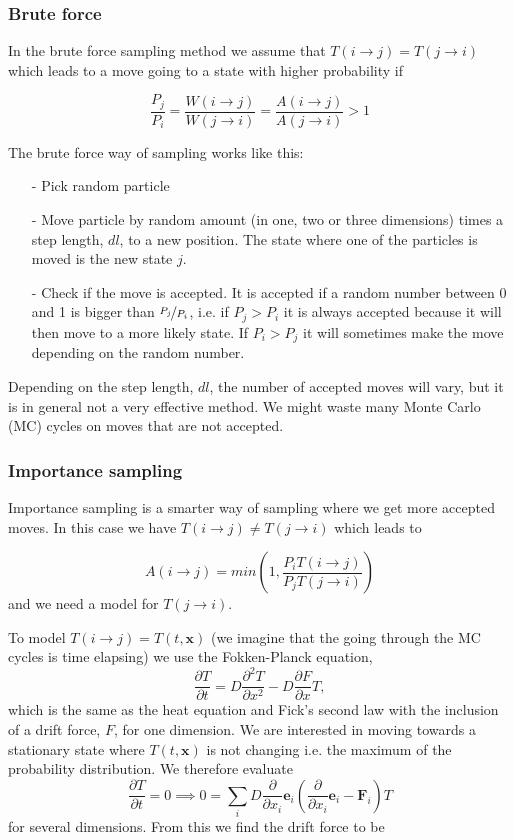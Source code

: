 \subsubsection{Brute force}

In the brute force sampling method we assume that $ T(i\rightarrow j) = T(j\rightarrow i)$ which leads to a move going to a state with higher probability if

$$ \frac{P_j}{P_i} = \frac{W(i\rightarrow j)}{W(j\rightarrow i)} = \frac{A(i\rightarrow j)}{A(j\rightarrow i)} > 1$$

The brute force way of sampling works like this:
\begin{itemize}
\item[-] Pick random particle
\item[-] Move particle by random amount (in one, two or three dimensions) times a step length, $dl$, to a new position. The state where one of the particles is moved is the new state $j$.
\item[-] Check if the move is accepted. It is accepted if a random number between 0 and 1 is bigger than $\nicefrac{P_j}{P_i}$, i.e. if $P_j>P_i$ it is always accepted  because it will then move to a more likely state. If $P_i>P_j$ it will sometimes make the move depending on the random number.
\end{itemize}

Depending on the step length, $dl$, the number of accepted moves will vary, but it is in general not a very effective method. We might waste many Monte Carlo (MC) cycles on moves that are not accepted.

\subsubsection{Importance sampling}

Importance sampling is a smarter way of sampling where we get more accepted moves. In this case we have $ T(i\rightarrow j) \neq T(j\rightarrow i)$ which leads to

$$  A(i\rightarrow j) = min\left( 1, \frac{P_i T(i\rightarrow j)}{P_j T(j\rightarrow i)}  \right)$$ and we need a model for  $T(j\rightarrow i)$.

To model $T (i \rightarrow j) = T(t, \mathbf{x} )$ (we imagine that the going through the MC cycles is time elapsing) we use the Fokken-Planck equation, 
\begin{equation}\label{eq:fokken_planck}
\frac{\partial T}{\partial t} = D \frac{\partial^2 T}{\partial x^2} - D \frac{\partial F}{\partial x} T,
\end{equation}
which is the same as the heat equation and Fick's second law with the inclusion of a drift force, $F$, for one dimension.  We are interested in moving towards a stationary state where $T (t, \mathbf{x})$ is not changing i.e. the maximum of the probability distribution. We therefore evaluate 
$$  \frac{\partial T}{\partial t} = 0 \implies 0 = \sum_i D \frac{\partial}{\partial x_i} \mathbf{e}_i \left( \frac{\partial}{\partial x_i} \mathbf{e}_i - \mathbf{F}_i\right) T $$
for several dimensions. From this we find the drift force to be 

